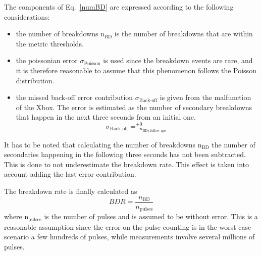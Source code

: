 The components of Eq.~\ref{numBD} are expressed according to the following considerations:
\begin{itemize}
\item the number of breakdowns n$_{\text{BD}}$ is the number of breakdowns that are within the metric thresholds.  
\item the poissonian error $\sigma_{\text{Poisson}}$ is used since the breakdown events are rare, and it is therefore reasonable to assume that this phenomenon follows the Poisson distribution.
\item the missed back-off error contribution $ \sigma_{\text{Back-off}}$ is given from the malfunction of the Xbox. The error is estimated as the number of secondary breakdowns that happen in the next three seconds from an initial one. 
\begin{equation}
\sigma_{\text{Back-off}} = _{- n_{\text{BDs follow-ups}}}^{+ 0}
\end{equation}
\end{itemize}
It has to be noted that calculating the number of breakdowns n$_{\text{BD}}$ the number of secondaries happening in the following three seconds has not been subtracted. This is done to not underestimate the breakdown rate. This effect is taken into account adding the last error contribution.


The breakdown rate is finally calculated as
\begin{equation}
BDR = \frac{n_{\text{BD}}}{n_{\text{pulses}}}
\end{equation}
where n$_{\text{pulses}}$ is the number of pulses and is assumed to be without error. This is a reasonable assumption since the error on the pulse counting is in the worst case scenario a few hundreds of pulses, while measurements involve several millions of pulses.


